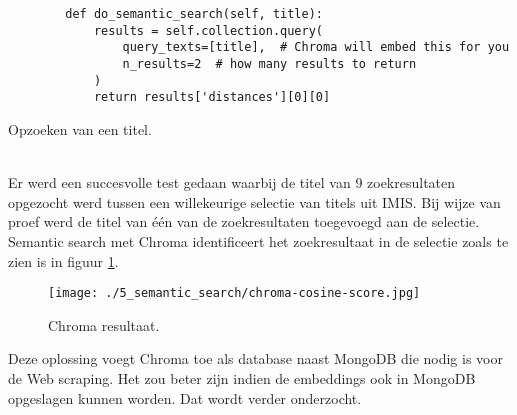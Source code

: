 \begin{listing}
    \begin{verbatim}
        def do_semantic_search(self, title):
            results = self.collection.query(
                query_texts=[title],  # Chroma will embed this for you
                n_results=2  # how many results to return
            )
            return results['distances'][0][0]
    \end{verbatim}
    \caption[Query Chroma]{Opzoeken van een titel.}
    \label{code:Chromaquery}
\end{listing}
\\
Er werd een succesvolle test gedaan waarbij de titel van 9 zoekresultaten opgezocht werd tussen een willekeurige selectie van titels uit IMIS. Bij wijze van proef werd de titel van één van de zoekresultaten toegevoegd aan de selectie. Semantic search met Chroma identificeert het zoekresultaat in de selectie zoals te zien is in figuur \ref{fig:Chroma}.
\begin{figure}
    \centering
    \texttt{[image: ./5\_semantic\_search/chroma-cosine-score.jpg]}
    \caption[Chroma resultaat.]{\label{fig:Chroma}Chroma resultaat.}
\end{figure}
Deze oplossing voegt Chroma toe als database naast MongoDB die nodig is voor de Web scraping. Het zou beter zijn indien de embeddings ook in MongoDB opgeslagen kunnen worden. Dat wordt verder onderzocht.
